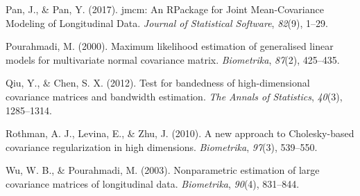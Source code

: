\documentclass{beamer}
\begin{document}
\begin{frame}[allowframebreaks]
\leavevmode\hypertarget{ref-Pan:2017il}{}%
Pan, J., \& Pan, Y. (2017). jmcm: An RPackage for Joint Mean-Covariance
Modeling of Longitudinal Data. \emph{Journal of Statistical Software},
\emph{82}(9), 1--29.

\leavevmode\hypertarget{ref-Pourahmadi:2000fs}{}%
Pourahmadi, M. (2000). Maximum likelihood estimation of generalised
linear models for multivariate normal covariance matrix.
\emph{Biometrika}, \emph{87}(2), 425--435.

\leavevmode\hypertarget{ref-Qiu:2012jy}{}%
Qiu, Y., \& Chen, S. X. (2012). Test for bandedness of high-dimensional
covariance matrices and bandwidth estimation. \emph{The Annals of
Statistics}, \emph{40}(3), 1285--1314.

\leavevmode\hypertarget{ref-Rothman:2010cy}{}%
Rothman, A. J., Levina, E., \& Zhu, J. (2010). A new approach to
Cholesky-based covariance regularization in high dimensions.
\emph{Biometrika}, \emph{97}(3), 539--550.

\leavevmode\hypertarget{ref-Wu:2003fk}{}%
Wu, W. B., \& Pourahmadi, M. (2003). Nonparametric estimation of large
covariance matrices of longitudinal data. \emph{Biometrika},
\emph{90}(4), 831--844.

\end{frame}
\end{document}

